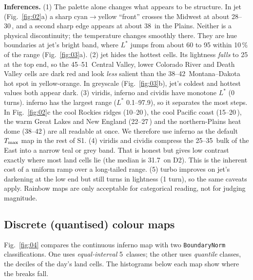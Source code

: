 \textbf{Inferences.}
(1) The palette alone changes what appears to be structure. In jet (Fig.~\ref{fig:02}a) a sharp cyan$\rightarrow$yellow
``front'' crosses the Midwest at about 28--30\,\degC, and a second sharp edge appears at about 38\,\degC{} in the Plains.
Neither is a physical discontinuity; the temperature changes smoothly there. They are hue boundaries at jet's bright
band, where $L^*$ jumps from about 60 to 95 within 10\,\% of the range (Fig.~\ref{fig:03}a).
(2) jet hides the hottest cells. Its lightness \emph{falls} to 25 at the top end, so the 45--51\,\degC{} Central Valley,
lower Colorado River and Death Valley cells are dark red and look \emph{less} salient than the 38--42\,\degC{}
Montana--Dakota hot spot in yellow-orange. In greyscale (Fig.~\ref{fig:03}b), jet's coldest and hottest values both appear
dark.
(3) viridis, inferno and cividis have monotone $L^*$ (0 turns). inferno has the largest range ($L^*$ 0.1--97.9), so it
separates the most steps. In Fig.~\ref{fig:02}c the cool Rockies ridges (10--20\,\degC), the cool Pacific coast
(15--20\,\degC), the warm Great Lakes and New England (22--27\,\degC) and the northern-Plains heat dome (38--42\,\degC) are
all readable at once. We therefore use inferno as the default $T_{\max}$ map in the rest of S1.
(4) viridis and cividis compress the 25--35\,\degC{} bulk of the East into a narrow teal or grey band. That is honest but
gives low contrast exactly where most land cells lie (the median is 31.7\,\degC{} on D2). This is the inherent cost of a
uniform ramp over a long-tailed range.
(5) turbo improves on jet's darkening at the low end but still turns in lightness (1 turn), so the same caveats apply.
Rainbow maps are only acceptable for categorical reading, not for judging magnitude.

\subsection{Discrete (quantised) colour maps}
Fig.~\ref{fig:04} compares the continuous inferno map with two \texttt{BoundaryNorm} classifications. One uses
\emph{equal-interval} 5\,\degC{} classes; the other uses \emph{quantile} classes, the deciles of the day's land cells. The
histograms below each map show where the breaks fall.


